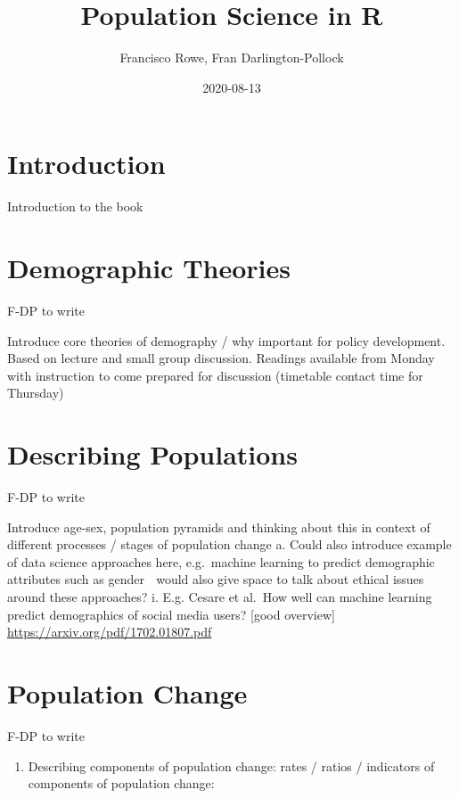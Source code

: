\documentclass[
]{book}
\title{Population Science in R}
\author{Francisco Rowe, Fran Darlington-Pollock}
\date{2020-08-13}
\providecommand{\tightlist}{%
  \setlength{\itemsep}{0pt}\setlength{\parskip}{0pt}}
\begin{document}
\maketitle

{
\setcounter{tocdepth}{1}
\tableofcontents
}
\hypertarget{introduction}{%
\chapter{Introduction}\label{introduction}}

Introduction to the book

\hypertarget{intro}{%
\chapter{Demographic Theories}\label{intro}}

F-DP to write

Introduce core theories of demography / why important for policy development. Based on lecture and small group discussion. Readings available from Monday with instruction to come prepared for discussion (timetable contact time for Thursday)

\hypertarget{describing-populations}{%
\chapter{Describing Populations}\label{describing-populations}}

F-DP to write

Introduce age-sex, population pyramids and thinking about this in context of different processes / stages of population change
a. Could also introduce example of data science approaches here, e.g.~machine learning to predict demographic attributes such as gender  would also give space to talk about ethical issues around these approaches?
i. E.g. Cesare et al.~How well can machine learning predict demographics of social media users? {[}good overview{]} \url{https://arxiv.org/pdf/1702.01807.pdf}

\hypertarget{population-change}{%
\chapter{Population Change}\label{population-change}}

F-DP to write

\begin{enumerate}
\def\labelenumi{\arabic{enumi}.}
\setcounter{enumi}{2}
\tightlist
\item
  Describing components of population change: rates / ratios / indicators of components of population change:
\end{enumerate}
\end{document}
